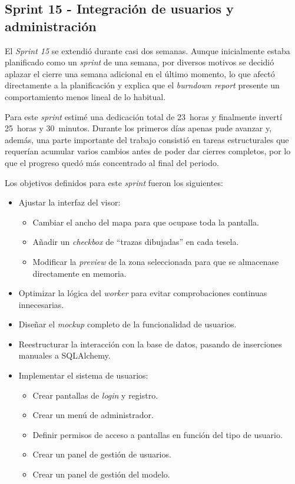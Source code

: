 \subsection{Sprint 15 - Integración de usuarios y administración}
El \textit{Sprint 15} se extendió durante casi dos semanas. Aunque inicialmente estaba planificado como un \textit{sprint} de una semana, por diversos motivos se decidió aplazar el cierre una semana adicional en el último momento, lo que afectó directamente a la planificación y explica que el \textit{burndown report} presente un comportamiento menos lineal de lo habitual. 

Para este \textit{sprint} estimé una dedicación total de 23~horas y finalmente invertí 25~horas y 30~minutos. Durante los primeros días apenas pude avanzar y, además, una parte importante del trabajo consistió en tareas estructurales que requerían acumular varios cambios antes de poder dar cierres completos, por lo que el progreso quedó más concentrado al final del periodo.

Los objetivos definidos para este \textit{sprint} fueron los siguientes:
\begin{itemize}
	\item Ajustar la interfaz del visor:
	\begin{itemize}
		\item Cambiar el ancho del mapa para que ocupase toda la pantalla.
		\item Añadir un \textit{checkbox} de ``trazas dibujadas'' en cada tesela.
		\item Modificar la \textit{preview} de la zona seleccionada para que se almacenase directamente en memoria.
	\end{itemize}
	\item Optimizar la lógica del \textit{worker} para evitar comprobaciones continuas innecesarias.
	\item Diseñar el \textit{mockup} completo de la funcionalidad de usuarios.
	\item Reestructurar la interacción con la base de datos, pasando de inserciones manuales a SQLAlchemy.
	\item Implementar el sistema de usuarios:
	\begin{itemize}
		\item Crear pantallas de \textit{login} y registro.
		\item Crear un menú de administrador.
		\item Definir permisos de acceso a pantallas en función del tipo de usuario.
		\item Crear un panel de gestión de usuarios.
		\item Crear un panel de gestión del modelo.
	\end{itemize}
\end{itemize}

